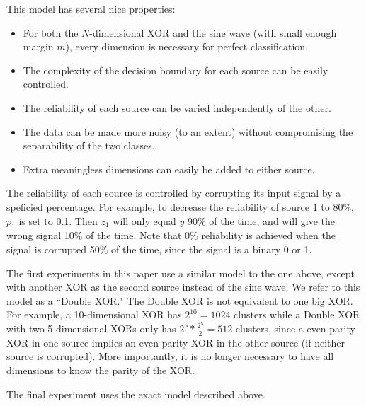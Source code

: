 \documentclass{article}
\begin{document}
\begin{minipage}{\textwidth}
\begin{minipage}{.48\textwidth}
    \label{fig:sine_wave}
\end{minipage}
\end{minipage}

This model has several nice properties:
\begin{itemize}
    \item For both the $N$-dimensional XOR and the sine wave (with small enough
        margin $m$), every dimension is necessary for perfect classification.
    \item The complexity of the decision boundary for each source can be easily
        controlled.
    \item The reliability of each source can be varied independently of the
        other.
    \item The data can be made more noisy (to an extent) without
        compromising the separability of the two classes.
    \item Extra meaningless dimensions can easily be added to either source.
\end{itemize}

The reliability of each source is controlled by corrupting its input signal by
a speficied percentage. For example, to decrease the reliability of source 1 to
80\%, $p_1$ is set to 0.1. Then $z_1$ will only equal $y$ 90\% of the time, and
will give the wrong signal 10\% of the time. Note that 0\% reliability is
achieved when the signal is corrupted 50\% of the time, since the signal is a
binary 0 or 1.

The first experiments in this paper use a similar model to the one above,
except with another XOR as the second source instead of the sine wave. We refer
to this model as a ``Double XOR." The Double XOR is not equivalent to one big
XOR. For example, a 10-dimensional XOR has $2^{10}=1024$ clusters while a Double
XOR with two 5-dimensional XORs only has $2^5 * \frac{2^5}{2} = 512$ clusters,
since a even parity XOR in one source implies an even parity XOR in the other
source (if neither source is corrupted). More importantly, it is no longer
necessary to have all dimensions to know the parity of the XOR.

The final experiment uses the exact model described above.
\end{document}
